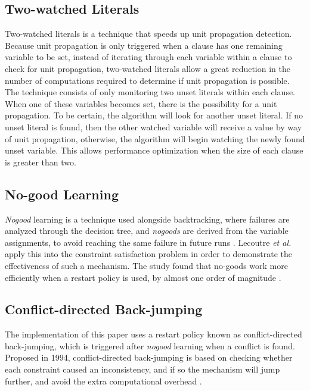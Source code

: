 \documentclass[runningheads]{llncs}
\begin{document}
\subsection{Two-watched Literals}
Two-watched literals is a technique that speeds up unit propagation detection. Because unit propagation is only triggered when a clause has one remaining variable to be set, instead of iterating through each variable within a clause to check for unit propagation, two-watched literals allow a great reduction in the number of computations required to determine if unit propagation is possible. The technique consists of only monitoring two unset literals within each clause. When one of these variables becomes set, there is the possibility for a unit propagation. To be certain, the algorithm will look for another unset literal. If no unset literal is found, then the other watched variable will receive a value by way of unit propagation, otherwise, the algorithm will begin watching the newly found unset variable. This allows performance optimization when the size of each clause is greater than two.

\subsection{No-good Learning}
\emph{Nogood} learning is a technique used alongside backtracking, where failures are analyzed through the decision tree, and \emph{nogoods} are derived from the variable assignments, to avoid reaching the same failure in future runs \cite{nogoodlearningdefinition}. Lecoutre \emph{et al.} apply this into the constraint satisfaction problem in order to demonstrate the effectiveness of such a mechanism. The study found that no-goods work more efficiently when a restart policy is used, by almost one order of magnitude \cite{lecoutre2007nogood}.

\subsection{Conflict-directed Back-jumping}
The implementation of this paper uses a restart policy known as conflict-directed back-jumping, which is triggered after \emph{nogood} learning when a conflict is found. Proposed in 1994, conflict-directed back-jumping is based on checking whether each constraint caused an inconsistency, and if so the mechanism will jump further, and avoid the extra computational overhead \cite{prosser1994binary}. 
\end{document}
